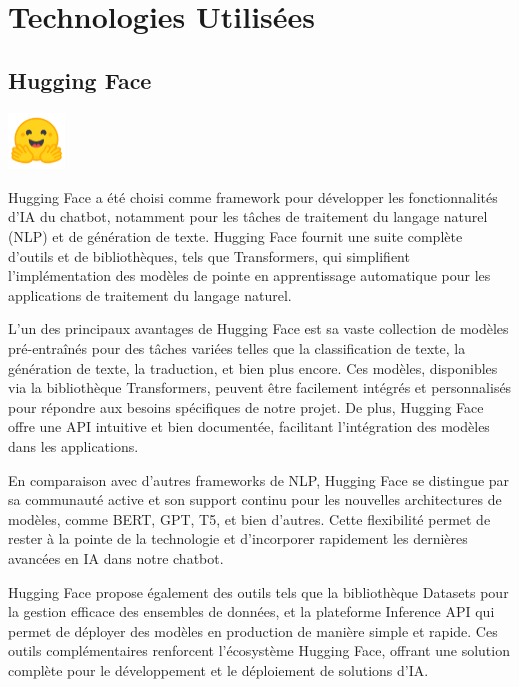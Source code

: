 \documentclass[a4paper, 11pt, openany]{report}
\begin{document}
\newpage

\section{Technologies Utilisées}

\subsection{Hugging Face}
\begin{center}
\includegraphics[height=1.5cm]{face.png}
\end{center}

Hugging Face a été choisi comme framework pour développer les fonctionnalités d'IA du chatbot, notamment pour les tâches de traitement du langage naturel (NLP) et de génération de texte. Hugging Face fournit une suite complète d'outils et de bibliothèques, tels que Transformers, qui simplifient l'implémentation des modèles de pointe en apprentissage automatique pour les applications de traitement du langage naturel.

L'un des principaux avantages de Hugging Face est sa vaste collection de modèles pré-entraînés pour des tâches variées telles que la classification de texte, la génération de texte, la traduction, et bien plus encore. Ces modèles, disponibles via la bibliothèque Transformers, peuvent être facilement intégrés et personnalisés pour répondre aux besoins spécifiques de notre projet. De plus, Hugging Face offre une API intuitive et bien documentée, facilitant l'intégration des modèles dans les applications.

En comparaison avec d'autres frameworks de NLP, Hugging Face se distingue par sa communauté active et son support continu pour les nouvelles architectures de modèles, comme BERT, GPT, T5, et bien d'autres. Cette flexibilité permet de rester à la pointe de la technologie et d'incorporer rapidement les dernières avancées en IA dans notre chatbot.

Hugging Face propose également des outils tels que la bibliothèque Datasets pour la gestion efficace des ensembles de données, et la plateforme Inference API qui permet de déployer des modèles en production de manière simple et rapide. Ces outils complémentaires renforcent l'écosystème Hugging Face, offrant une solution complète pour le développement et le déploiement de solutions d'IA.
\end{document}

